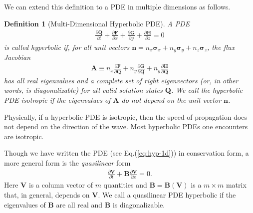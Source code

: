 \documentclass[12pt]{article}
\newtheorem{definition}{Definition}
\theoremstyle{definition}
\theoremstyle{definition}
\theoremstyle{definition}
\newcommand{\eqr}[1]{Eq.\thinspace(#1)}
\newcommand{\pfrac}[2]{\frac{\partial #1}{\partial #2}}
\newcommand{\mvec}[1]{\mathbf{#1}}
\newcommand{\gvec}[1]{\boldsymbol{#1}}
\newcommand{\cbas}[1]{\gvec{\sigma}_{#1}}
\begin{document}
We can extend this definition to a PDE in multiple dimensions as
follows.
\begin{definition}[Multi-Dimensional Hyperbolic PDE]
  A PDE
  \begin{align*}
    \pfrac{\mvec{Q}}{t} 
    + \pfrac{\mvec{F}}{x}
    + \pfrac{\mvec{G}}{y}
    + \pfrac{\mvec{H}}{z} = 0
  \end{align*}
  is called \emph{hyperbolic} if, for all unit vectors
  $\mvec{n} = n_x \cbas{x} + n_y \cbas{y} + n_z \cbas{z}$, the flux
  Jacobian
  \begin{align*}
    \mvec{A} \equiv 
    n_x \pfrac{\mvec{F}}{\mvec{Q}}
    + n_y \pfrac{\mvec{G}}{\mvec{Q}}
    + n_y \pfrac{\mvec{H}}{\mvec{Q}}
  \end{align*}
  has all real eigenvalues and a complete set of right eigenvectors
  (or, in other words, is diagonalizable) for all valid solution
  states $\mvec{Q}$. We call the hyperbolic PDE \emph{isotropic} if
  the eigenvalues of $\mvec{A}$ do not depend on the unit vector
  $\mvec{n}$.
\end{definition}

Physically, if a hyperbolic PDE is isotropic, then the speed of
propagation does not depend on the direction of the wave. Most
hyperbolic PDEs one encounters are isotropic.

Though we have written the PDE (see \eqr{\ref{eq:hyp-1d}}) in
conservation form, a more general form is the \emph{quasilinear} form
\begin{align}
  \pfrac{\mvec{V}}{t} + \mvec{B}\pfrac{\mvec{V}}{x} = 0.
  \label{eq:ql-hyp-1d}
\end{align}
Here $\mvec{V}$ is a column vector of $m$ quantities and
$\mvec{B} = \mvec{B}(\mvec{V})$ is a $m\times m$ matrix that, in
general, depends on $\mvec{V}$. We call a quasilinear PDE hyperbolic
if the eigenvalues of $\mvec{B}$ are all real and $\mvec{B}$ is
diagonalizable. 
\end{document}
